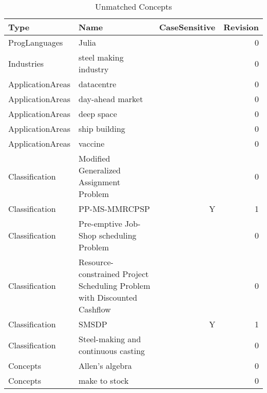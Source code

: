 {\scriptsize
\begin{longtable}{lp{10cm}rr}
\caption{Unmatched Concepts}\\ \toprule
Type & Name & CaseSensitive & Revision\\ \midrule
\endhead
\bottomrule
\endfoot
ProgLanguages & Julia &  & 0\\Industries & steel making industry &  & 0\\ApplicationAreas & datacentre &  & 0\\ApplicationAreas & day-ahead market &  & 0\\ApplicationAreas & deep space &  & 0\\ApplicationAreas & ship building &  & 0\\ApplicationAreas & vaccine &  & 0\\Classification & Modified Generalized Assignment Problem &  & 0\\Classification & PP-MS-MMRCPSP & Y & 1\\Classification & Pre-emptive Job-Shop scheduling Problem &  & 0\\Classification & Resource-constrained Project Scheduling Problem with Discounted Cashflow &  & 0\\Classification & SMSDP & Y & 1\\Classification & Steel-making and continuous casting &  & 0\\Concepts & Allen's algebra &  & 0\\Concepts & make to stock &  & 0\\\end{longtable}
}

